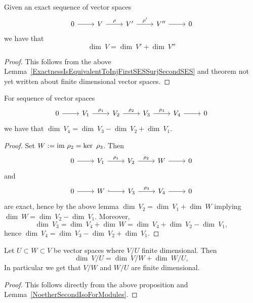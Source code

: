\begin{lemma}\label{DimensionsOfExactSequence}
        Given an exact sequence of vector spaces
         $$\begin{tikzcd}
            0 \arrow[r] &V \arrow[r,"\rho"] & V' \arrow[r,"\rho'"] & V'' \arrow[r] & 0
        \end{tikzcd}$$
        we have that 
        $$\dim\ V= \dim \ V' + \dim \ V''$$
    \end{lemma}
    \begin{proof}
        This follows from the above Lemma~\ref{ExactnessIsEquivalentToInjFirstSESSurjSecondSES} and {\LARGE theorem not yet written about finite dimensional vector spaces}.
    \end{proof}
    \begin{proposition}
        For sequence of vector spaces
         $$\begin{tikzcd}
            0 \arrow[r] & V_1 \arrow[r,"\rho_1"] & V_2 \arrow[r,"\rho_2"] & V_3 \arrow[r,"\rho_3"] & V_4 \arrow[r] & 0
        \end{tikzcd}$$
        we have that 
        $\dim \ V_4 = \dim \ V_3 -\dim \ V_2 + \dim \ V_1$.
    \end{proposition}
    \begin{proof}
        Set $W := \mathrm{im} \ \rho_2 = \ker \ \rho_3$. Then 
        $$\begin{tikzcd}
            0 \arrow[r] & V_1 \arrow[r,"\rho_1"] & V_2 \arrow[r,"\rho_2"] & W \arrow[r] & 0 
        \end{tikzcd}$$
        and 
        $$\begin{tikzcd}
            0\arrow[r] &W \arrow[hookrightarrow,r] &V_3 \arrow[r, "\rho_3"] &V_4 \arrow[r] &0
        \end{tikzcd}$$
        are exact, hence by the above lemma $\dim \ V_2 = \dim \ V_1 +\dim \ W$ implying $\dim \ W = \dim \ V_2- \dim \ V_1$. Moreover, 
        $$\dim\ V_3 = \dim \ V_4 +\dim \ W = \dim \ V_4 +\dim \ V_2 - \dim \ V_1,$$
        hence $\dim \ V_4 = \dim \ V_3 -\dim \ V_2 +\dim \ V_1.$
    \end{proof}
    \begin{lemma}\label{SecondIsomorphismTheoremForVS}
        Let $U\subset W\subset V$ be vector spaces where $V/U$ finite dimensional. Then 
        $$\dim\ V/U = \dim \ V/W+ \dim \ W/U,$$
        In particular we get that $V/W$ and $W/U$ are finite dimensional. 
    \end{lemma}
    \begin{proof}
        This follows directly from the above proposition and Lemma~\ref{NoetherSecondIsoForModules}. 
    \end{proof}
